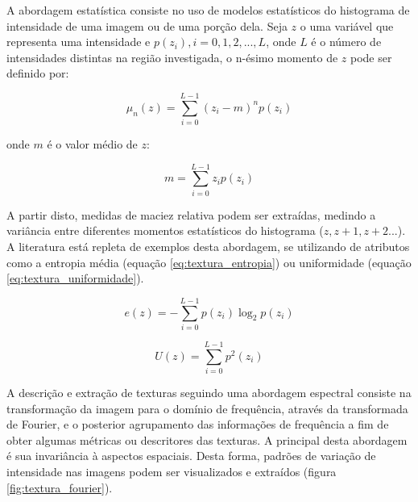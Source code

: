 A abordagem estatística consiste no uso de modelos estatísticos do histograma de intensidade de uma imagem ou de uma porção dela. Seja $z$ o uma variável que representa uma intensidade e $p(z_i), i = 0, 1, 2,..., L$, onde $L$ é o número de intensidades distintas na região investigada, o n-ésimo momento de $z$ pode ser definido por:

\begin{equation}
	\displaystyle \mu_n(z) = \sum_{i=0}^{L-1} (z_i - m)^n p(z_i)
\end{equation}

onde $m$ é o valor médio de $z$:

\begin{equation}
	\displaystyle m = \sum_{i=0}^{L-1} z_i p(z_i)
\end{equation}

A partir disto, medidas de maciez relativa podem ser extraídas, medindo a variância entre diferentes momentos estatísticos do histograma ($z, z+1, z+2...$). A literatura está repleta de exemplos desta abordagem, se utilizando de atributos como a entropia média (equação \ref{eq:textura_entropia}) ou uniformidade (equação \ref{eq:textura_uniformidade}).

\begin{equation}
	\displaystyle e(z) = - \sum_{i=0}^{L-1} p(z_i) \log_2 p(z_i)
	\label{eq:textura_entropia}
\end{equation}

\begin{equation}
	\displaystyle U(z) = \sum_{i=0}^{L-1} p^2(z_i)
	\label{eq:textura_uniformidade}
\end{equation}

A descrição e extração de texturas seguindo uma abordagem espectral consiste na transformação da imagem para o domínio de frequência, através da transformada de Fourier, e o posterior agrupamento das informações de frequência a fim de obter algumas métricas ou descritores das texturas. A principal desta abordagem é sua invariância à aspectos espaciais. Desta forma, padrões de variação de intensidade nas imagens podem ser visualizados e extraídos (figura \ref{fig:textura_fourier}).

